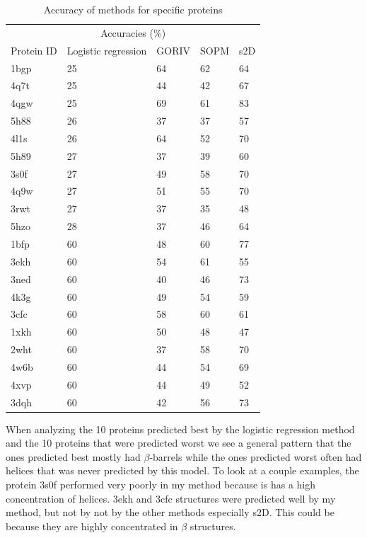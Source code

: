 \documentclass{article}
\begin{document}
\begin{table}[t]
  \caption{Accuracy of methods for specific proteins}
  \centering
  \begin{tabular}{lllll}
    \toprule
    \multicolumn{5}{c}{Accuracies (\%)}\\
    \cmidrule{2-5}
    Protein ID & Logistic regression & GORIV & SOPM & s2D\\
    \midrule
    1bgp & 25 & 64&62&64 \\
    4q7t & 25 & 44 & 42 & 67 \\
    4qgw & 25 & 69 & 61 & 83 \\
    5h88 & 26 & 37&37&57 \\
    4l1s & 26 & 64&52&70 \\
    
    5h89 & 27 & 37&39&60 \\
    3s0f & 27 & 49 & 58 & 70 \\
    4q9w & 27 & 51&55&70 \\
    3rwt & 27 & 37&35&48 \\
    5hzo & 28 & 37 & 46 & 64 \\
    \midrule
    1bfp & 60 & 48&60&77 \\
    3ekh & 60 & 54&61&55 \\
    3ned & 60 & 40&46&73 \\
    4k3g & 60 & 49&54&59 \\
    3cfc & 60 & 58 &60&61 \\
    
    1xkh & 60 & 50&48&47 \\
    2wht & 60 & 37&58&70 \\
    4w6b & 60 & 44&54&69 \\
    4xvp & 60 & 44&49&52 \\
    3dqh & 60 & 42&56&73 \\
    \bottomrule
  \end{tabular}
\end{table}

When analyzing the 10 proteins predicted best by the logistic regression method and the 10 proteins that were predicted worst we see a general pattern that the ones predicted best mostly had $\beta$-barrels while the ones predicted worst often had helices that was never predicted by this model. To look at a couple examples, the protein 3s0f performed very poorly in my method because is has a high concentration of helices. 3ekh and 3cfc structures were predicted well by my method, but not by not by the other methods especially s2D. This could be because they are highly concentrated in $\beta$ structures.
\end{document}
